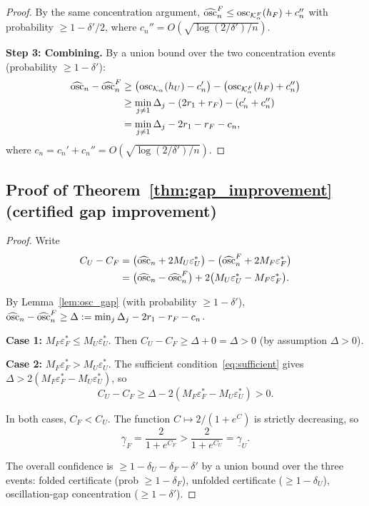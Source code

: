 \begin{proof}
  By the same concentration argument,
  $\widehat{\mathrm{osc}}_n^F \leq \mathrm{osc}_{\mathcal{K}_\alpha^F}(h_F) + c_n''$
  with probability $\geq 1 - \delta'/2$, where
  $c_n'' = O(\sqrt{\log(2/\delta')/n})$.

  \textbf{Step 3: Combining.}
  By a union bound over the two concentration events
  (probability $\geq 1 - \delta'$):
  \begin{align*}
    \widehat{\mathrm{osc}}_n - \widehat{\mathrm{osc}}_n^F
    &\geq \bigl(\mathrm{osc}_{\mathcal{K}_\alpha}(h_U) - c_n'\bigr)
    - \bigl(\mathrm{osc}_{\mathcal{K}_\alpha^F}(h_F) + c_n''\bigr) \\
    &\geq \min_{j \neq 1}\Delta_j - (2r_1 + r_F) - (c_n' + c_n'')
    \\
    &= \min_{j \neq 1}\Delta_j - 2r_1 - r_F - c_n,
  \end{align*}
  where $c_n = c_n' + c_n'' = O(\sqrt{\log(2/\delta')/n})$.
\end{proof}


\subsection{Proof of Theorem~\ref{thm:gap_improvement}
  (certified gap improvement)}
\label{app:proof_gap}

\begin{proof}
  Write
  \begin{align*}
    C_U - C_F
    &= \bigl(\widehat{\mathrm{osc}}_n + 2M_U\varepsilon_U^*\bigr)
    - \bigl(\widehat{\mathrm{osc}}_n^F + 2M_F\varepsilon_F^*\bigr) \\
    &= \bigl(\widehat{\mathrm{osc}}_n - \widehat{\mathrm{osc}}_n^F\bigr)
    + 2\bigl(M_U\varepsilon_U^* - M_F\varepsilon_F^*\bigr).
  \end{align*}

  By Lemma~\ref{lem:osc_gap} (with probability
  $\geq 1 - \delta'$),
  $\widehat{\mathrm{osc}}_n - \widehat{\mathrm{osc}}_n^F \geq \Delta
  := \min_j \Delta_j - 2r_1 - r_F - c_n$.

  \textbf{Case 1:}
  $M_F\varepsilon_F^* \leq M_U\varepsilon_U^*$.
  Then $C_U - C_F \geq \Delta + 0 = \Delta > 0$
  (by assumption $\Delta > 0$).

  \textbf{Case 2:}
  $M_F\varepsilon_F^* > M_U\varepsilon_U^*$.
  The sufficient condition~\eqref{eq:sufficient} gives
  $\Delta > 2(M_F\varepsilon_F^* - M_U\varepsilon_U^*)$, so
  \[
    C_U - C_F
    \geq \Delta - 2(M_F\varepsilon_F^* - M_U\varepsilon_U^*) > 0.
  \]

  In both cases, $C_F < C_U$.  The function
  $C \mapsto 2/(1 + e^C)$ is strictly decreasing, so
  \[
    \underline{\gamma}_F
    = \frac{2}{1 + e^{C_F}}
    > \frac{2}{1 + e^{C_U}}
    = \underline{\gamma}_U.
  \]

  The overall confidence is $\geq 1 - \delta_U - \delta_F - \delta'$
  by a union bound over the three events:
  folded certificate (prob $\geq 1 - \delta_F$),
  unfolded certificate ($\geq 1 - \delta_U$),
  oscillation-gap concentration ($\geq 1 - \delta'$).
\end{proof}


